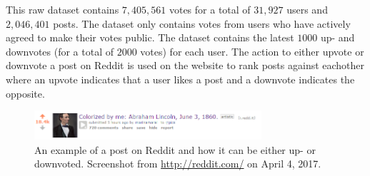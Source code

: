 This raw dataset contains $7,405,561$ votes for a total of $31,927$ users and $ 2,046,401$ posts. The dataset only contains votes from users who have actively agreed to make their votes public. The dataset contains the latest $1000$ up- and downvotes (for a total of $2000$ votes) for each user. The action to either upvote or downvote a post on Reddit is used on the website to rank posts against eachother where an upvote indicates that a user likes a post and a downvote indicates the opposite. 
\begin{figure}[h]
    \centering
    \includegraphics[width=0.75\textwidth]{figure/reddit/reddit_voting}
    \caption{An example of a post on Reddit and how it can be either up- or downvoted. Screenshot from \url{http://reddit.com/} on April 4, 2017.}
    \label{fig:example_reddit_post}
\end{figure}